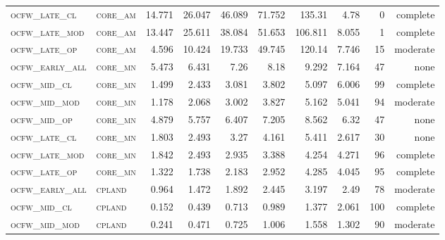 \begin{landscape}
\begin{center}
\begin{footnotesize}
\begin{longtable}{llrrrrr|rrr}
\textsc{ocfw\_late\_cl  } & \textsc{core\_am  }    & 14.771   & 26.047   & 46.089   & 71.752   & 135.31     & 4.78          & 0             & complete            \\
\textsc{ocfw\_late\_mod } & \textsc{core\_am  }    & 13.447   & 25.611   & 38.084   & 51.653   & 106.811    & 8.055         & 1             & complete        \\
\textsc{ocfw\_late\_op  } & \textsc{core\_am  }    & 4.596    & 10.424   & 19.733   & 49.745   & 120.14     & 7.746         & 15            & moderate        \\
\textsc{ocfw\_early\_all} & \textsc{core\_mn  }    & 5.473    & 6.431    & 7.26     & 8.18     & 9.292      & 7.164         & 47            & none        \\
\textsc{ocfw\_mid\_cl   } & \textsc{core\_mn  }    & 1.499    & 2.433    & 3.081    & 3.802    & 5.097      & 6.006         & 99            & complete        \\
\textsc{ocfw\_mid\_mod  } & \textsc{core\_mn  }    & 1.178    & 2.068    & 3.002    & 3.827    & 5.162      & 5.041         & 94            & moderate        \\
\textsc{ocfw\_mid\_op   } & \textsc{core\_mn  }    & 4.879    & 5.757    & 6.407    & 7.205    & 8.562      & 6.32          & 47            & none        \\
\textsc{ocfw\_late\_cl  } & \textsc{core\_mn  }    & 1.803    & 2.493    & 3.27     & 4.161    & 5.411      & 2.617         & 30            & none        \\
\textsc{ocfw\_late\_mod } & \textsc{core\_mn  }    & 1.842    & 2.493    & 2.935    & 3.388    & 4.254      & 4.271         & 96            & complete        \\
\textsc{ocfw\_late\_op  } & \textsc{core\_mn  }    & 1.322    & 1.738    & 2.183    & 2.952    & 4.285      & 4.045         & 95            & complete        \\
\textsc{ocfw\_early\_all} & \textsc{cpland    }    & 0.964    & 1.472    & 1.892    & 2.445    & 3.197      & 2.49          & 78            & moderate        \\
\textsc{ocfw\_mid\_cl   } & \textsc{cpland    }    & 0.152    & 0.439    & 0.713    & 0.989    & 1.377      & 2.061         & 100           & complete             \\
\textsc{ocfw\_mid\_mod  } & \textsc{cpland    }    & 0.241    & 0.471    & 0.725    & 1.006    & 1.558      & 1.302         & 90            & moderate        \\

\end{longtable}
\end{footnotesize}
\end{center}
\end{landscape}
